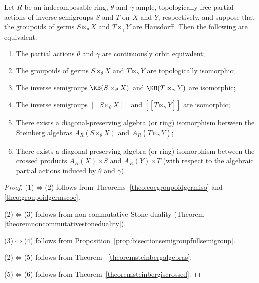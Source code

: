 \begin{theorem}
Let $R$ be an indecomposable ring, $\theta$ and $\gamma$ ample, topologically free partial actions of inverse semigroups $S$ and $T$ on $X$ and $Y$, respectively, and suppose that the groupoids of germs $S\ltimes_\theta X$ and $T\ltimes_\gamma Y$ are Hausdorff. Then the following are equivalent:
\begin{enumerate}\setlength\itemsep{1ex}
\item[(1)] The partial actions $\theta$ and $\gamma$ are continuously orbit equivalent;
\item[(2)] The groupoids of germs $S\ltimes_\theta X$ and $T\ltimes_\gamma Y$ are topologically isomorphic;
\item[(3)] The inverse semigroups $\KB(S\ltimes_\theta X)$ and $\KB(T\ltimes_\gamma Y)$ are isomorphic;
\item[(4)] The inverse semigroups $[[S\ltimes_\theta X]]$ and $[[T\ltimes_\gamma Y]]$ are isomorphic;
\item[(5)] There exists a diagonal-preserving algebra (or ring) isomorphism between the Steinberg algebras $A_R(S\ltimes_\theta X)$ and $A_R(T\ltimes_\gamma Y)$; 
\item[(6)] There exists a diagonal-preserving algebra (or ring) isomorphism between the crossed products $A_R(X)\rtimes S$ and $A_R(Y)\rtimes T$ (with respect to the algebraic partial actions induced by $\theta$ and $\gamma$).
\end{enumerate}
\end{theorem}

\begin{proof}
(1)$\iff$(2) follows from Theorems~\ref{theo:coegroupoidgermiso} and \ref{theo:groupoidgermscoe}.

(2)$\iff$(3) follows from non-commutative Stone duality (Theorem \ref{theoremnoncommutativestoneduality}).

(3)$\iff$(4) follows from Proposition~\ref{prop:bisectionsemigroupfullsemigroup}.

(2)$\iff$(5) follows from Theorem~ \ref{theoremsteinbergalgebras}.

(5)$\iff$(6) follows from Theorem~\ref{theoremsteinbergiscrossed}.\qedhere
\end{proof} 

